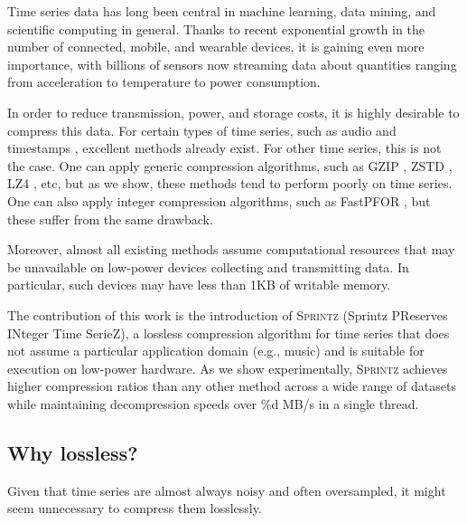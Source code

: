 
Time series data has long been central in machine learning, data mining, and scientific computing in general. Thanks to recent exponential growth in the number of connected, mobile, and wearable devices, it is gaining even more importance, with billions of sensors now streaming data about quantities ranging from acceleration to temperature to power consumption.

In order to reduce transmission, power, and storage costs, it is highly desirable to compress this data. For certain types of time series, such as audio \cite{flac, ...} and timestamps \cite{someLemire}, excellent methods already exist. For other time series, this is not the case. One can apply generic compression algorithms, such as GZIP \cite{gzip}, ZSTD \cite{zstd}, LZ4 \cite{lz4}, etc, but as we show, these methods tend to perform poorly on time series. One can also apply integer compression algorithms, such as FastPFOR \cite{fastpfor}, but these suffer from the same drawback.

Moreover, almost all existing methods assume computational resources that may be unavailable on low-power devices collecting and transmitting data. In particular, such devices may have less than 1KB of writable memory.

The contribution of this work is the introduction of \textsc{Sprintz} (Sprintz PReserves INteger Time SerieZ), a lossless compression algorithm for time series that does not assume a particular application domain (e.g., music) and is suitable for execution on low-power hardware. As we show experimentally, \textsc{Sprintz} achieves higher compression ratios than any other method across a wide range of datasets while maintaining decompression speeds over \%d MB/s in a single thread.

\subsection{Why lossless?}



Given that time series are almost always noisy and often oversampled, it might seem unnecessary to compress them losslessly. %

